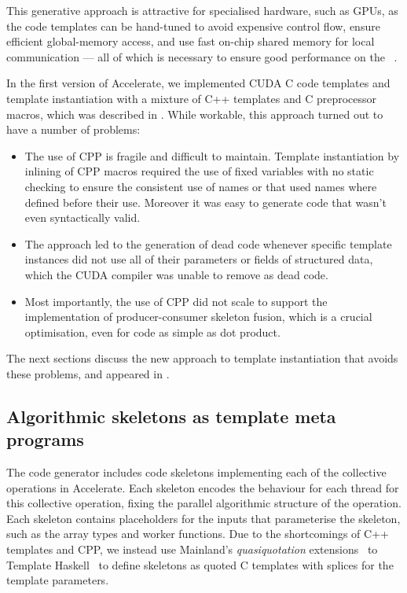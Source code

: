 This generative approach is attractive for specialised hardware, such as GPUs,
as the code templates can be hand-tuned to avoid expensive control flow, ensure
efficient global-memory access, and use fast on-chip shared memory for local
communication --- all of which is necessary to ensure good performance on the
\GPU~\cite{NVIDIA:2012wf}.

In the first version of Accelerate, we implemented CUDA C code templates and
template instantiation with a mixture of C++ templates and C preprocessor
macros, which was described in \cite{Chakravarty:2011fr}. While workable, this
approach turned out to have a number of problems:

\begin{itemize}
    \item The use of CPP is fragile and difficult to maintain. Template
        instantiation by inlining of CPP macros required the use of fixed
        variables with no static checking to ensure the consistent use of names
        or that used names where defined before their use. Moreover it was easy
        to generate code that wasn't even syntactically valid.

    \item The approach led to the generation of dead code whenever specific
        template instances did not use all of their parameters or fields of
        structured data, which the CUDA compiler was unable to remove as dead
        code.

    \item Most importantly, the use of CPP did not scale to support the
        implementation of producer-consumer skeleton fusion, which is a crucial
        optimisation, even for code as simple as dot product.

\end{itemize}

The next sections discuss the new approach to template instantiation that avoids
these problems, and appeared in \cite{CliftonEverest:2014vi}.


\subsection{Algorithmic skeletons as template meta programs}

The code generator includes \CUDA code skeletons implementing each of the
collective operations in Accelerate. Each skeleton encodes the behaviour for
each thread for this collective operation, fixing the parallel algorithmic
structure of the operation. Each skeleton contains placeholders for the inputs
that parameterise the skeleton, such as the array types and worker functions.
Due to the shortcomings of C++ templates and CPP, we instead use Mainland's
\emph{quasiquotation} extensions~\cite{Mainland:2007bl} to Template
Haskell~\cite{Sheard:2002wu} to define skeletons as quoted \CUDA C templates
with splices for the template parameters.

